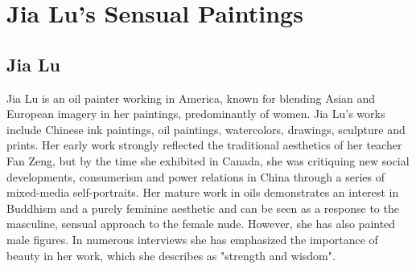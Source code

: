 \newpage


\chapter{Jia Lu's Sensual Paintings}

\restoregeometry

\section{Jia Lu}

Jia Lu is an oil painter working in America, known for blending Asian and European imagery in her paintings, predominantly of women. Jia Lu's works include Chinese ink paintings, oil paintings, watercolors, drawings, sculpture and prints. Her early work strongly reflected the traditional aesthetics of her teacher Fan Zeng, but by the time she exhibited in Canada, she was critiquing new social developments, consumerism and power relations in China through a series of mixed-media self-portraits. Her mature work in oils demonstrates an interest in Buddhism and a purely feminine aesthetic and can be seen as a response to the masculine, sensual approach to the female nude. However, she has also painted male figures. In numerous interviews she has emphasized the importance of beauty in her work, which she describes as "strength and wisdom".

\makeatletter
\@specialfalse












